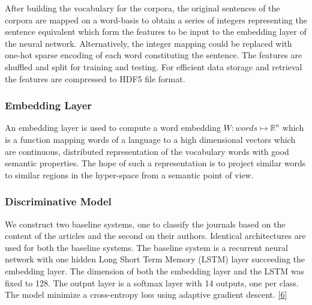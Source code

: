 \documentclass[12pt]{article}
\begin{document}
After building the vocabulary for the corpora, the original sentences of the corpora are mapped on a word-basis to obtain a series of integers representing the sentence equivalent which form the features to be input to the embedding layer of the neural network. Alternatively, the integer mapping could be replaced with one-hot sparse encoding of each word constituting the sentence. The features are shuffled and split for training and testing. For efficient data storage and retrieval the features are compressed to HDF5 file format.

\subsubsection{Embedding Layer}
An embedding layer is used to compute a word embedding $W: words \mapsto \mathbb{R}^{n}$ which is a function mapping words of a language to a high dimensional vectors which are continuous, distributed representation of the vocabulary words with good semantic properties. The hope of such a representation is to project similar words to similar regions in the hyper-space from a semantic point of view.

\subsubsection{Discriminative Model}

We construct two baseline systems, one to classify the journals based on the
content of the articles and the second on their authors. Identical architectures are used for both the baseline
systems. The baseline system is a recurrent neural network with one hidden Long
Short Term Memory (LSTM) layer succeeding the embedding layer. The dimension of
both the embedding layer and the LSTM was fixed to 128. The output layer is a
softmax layer with 14 outputs, one per class. The model minimize a cross-entropy loss using adaptive gradient descent. \href{References}{{[}6{]}}

\end{document}
